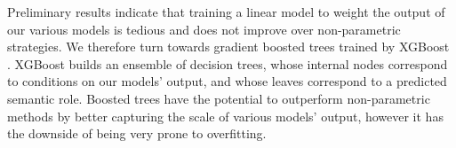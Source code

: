 Preliminary results indicate that training a linear model to weight the output of our various models is tedious and does not improve over non-parametric strategies.
We therefore turn towards gradient boosted trees \citep{gradient_boosting} trained by XGBoost \citep{xgboost}.
XGBoost builds an ensemble of decision trees, whose internal nodes correspond to conditions on our models' output, and whose leaves correspond to a predicted semantic role.
Boosted trees have the potential to outperform non-parametric methods by better capturing the scale of various models' output, however it has the downside of being very prone to overfitting.
